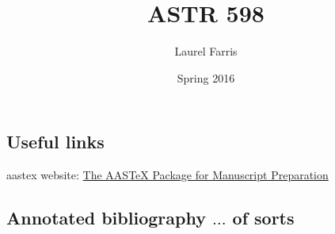 \documentclass[12pt]{article}
\title{ASTR 598}
\author{Laurel Farris}
\date{Spring 2016}
\begin{document}
\maketitle

\subsection*{Useful links}

aastex website: \textcolor{blue}
{\href{http://aas.org/aastex/aastex-package-manuscript-preparation}
{The AASTeX Package for Manuscript Preparation}}


\subsection*{Annotated bibliography $\ldots$ of sorts}
\end{document}
